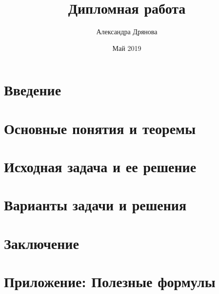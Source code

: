 \documentclass[12pt,twoside]{report}
\title{Дипломная работа}
\author{Александра Дрянова}
\date{Май 2019}
\begin{document}


\tableofcontents



\chapter{Введение}


\chapter{Основные понятия и теоремы}


\chapter{Исходная задача и ее решение}


\chapter{Варианты задачи и решения}


\chapter{Заключение}


\appendix
\chapter{Приложение: Полезные формулы}


\printbibliography
\end{document}
